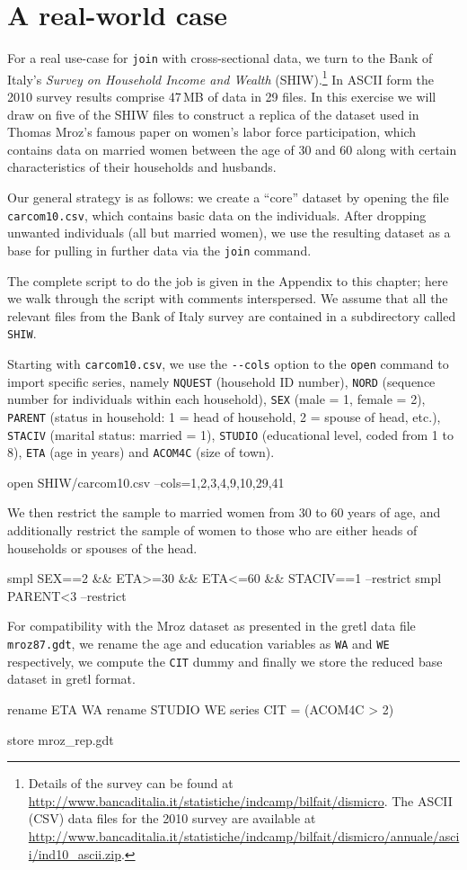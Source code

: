 \section{A real-world case}
\label{sec:join-SHIW}

For a real use-case for \texttt{join} with cross-sectional data, we
turn to the Bank of Italy's \textit{Survey on Household Income and
  Wealth} (SHIW).\footnote{Details of the survey can be found at
  \url{http://www.bancaditalia.it/statistiche/indcamp/bilfait/dismicro}.
  The ASCII (CSV) data files for the 2010 survey are available at
  \url{http://www.bancaditalia.it/statistiche/indcamp/bilfait/dismicro/annuale/ascii/ind10_ascii.zip}.}
In ASCII form the 2010 survey results comprise 47\,MB of data in 29
files. In this exercise we will draw on five of the SHIW files to
construct a replica of the dataset used in Thomas Mroz's famous paper
\citep{mroz87} on women's labor force participation, which contains
data on married women between the age of 30 and 60 along with certain
characteristics of their households and husbands.

Our general strategy is as follows: we create a ``core'' dataset by
opening the file \texttt{carcom10.csv}, which contains basic data on
the individuals. After dropping unwanted individuals (all but married
women), we use the resulting dataset as a base for pulling in further
data via the \texttt{join} command.

The complete script to do the job is given in the Appendix to this
chapter; here we walk through the script with comments interspersed.
We assume that all the relevant files from the Bank of Italy survey
are contained in a subdirectory called \texttt{SHIW}.

Starting with \texttt{carcom10.csv}, we use the \verb|--cols| option
to the \texttt{open} command to import specific series, namely
\texttt{NQUEST} (household ID number), \texttt{NORD} (sequence number
for individuals within each household), \texttt{SEX} (male = 1, female
= 2), \texttt{PARENT} (status in household: 1 = head of household, 2 =
spouse of head, etc.), \texttt{STACIV} (marital status: married = 1),
\texttt{STUDIO} (educational level, coded from 1 to 8),
\texttt{ETA} (age in years) and \texttt{ACOM4C} (size of town).
%
\begin{code}
open SHIW/carcom10.csv --cols=1,2,3,4,9,10,29,41
\end{code}
%
We then restrict the sample to married women from 30 to 60 years of
age, and additionally restrict the sample of women to those who are
either heads of households or spouses of the head.
%
\begin{code}
smpl SEX==2 && ETA>=30 && ETA<=60 && STACIV==1 --restrict
smpl PARENT<3  --restrict
\end{code}
%
For compatibility with the Mroz dataset as presented in the gretl
data file \texttt{mroz87.gdt}, we rename the age and education
variables as \texttt{WA} and \texttt{WE} respectively, we compute the
\texttt{CIT} dummy and finally we
store the reduced base dataset in gretl format.
%
\begin{code}
rename ETA WA
rename STUDIO WE
series CIT = (ACOM4C > 2)

store mroz_rep.gdt
\end{code}

